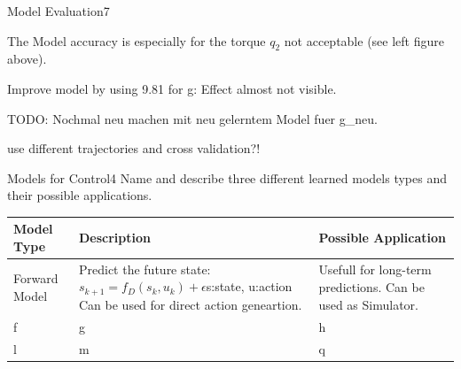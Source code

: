 \begin{questions}
\begin{question}{Model Evaluation}{7}
\begin{answer}
	The Model accuracy is especially for the torque $q_2$ not acceptable (see left figure above).
	
	Improve model by using 9.81 for g: Effect almost not visible.
	
	TODO:
	Nochmal neu machen mit neu gelerntem Model fuer g\_neu.
	
	use different trajectories and cross validation?! 
	
\end{answer}

\end{question}



\begin{question}[bonus]{Models for Control}{4}
Name and describe three different learned models types and their possible applications.
\end{question}
\begin{answer}

\begin{tabular}{|p{4cm}|p{7cm}|p{5cm}|}
		\hline
		Model Type&Description  &Possible Application \\
		\hline
				Forward Model &Predict the future state: $s_{k+1}=f_D(s_k,u_k)+\epsilon$s:state, u:action Can be used for direct action geneartion.  &Usefull for long-term predictions. Can be used as Simulator.
			\\	\hline
		f&g&h\\
		\hline
		l&m&q\\
		
\end{tabular}




\end{answer}
\end{questions}
